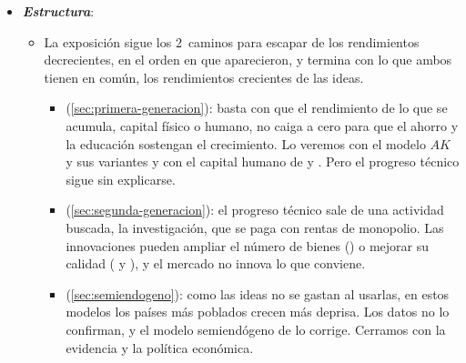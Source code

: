 \documentclass[11pt]{article}
\begin{document}
\begin{itemize}
\item \textbf{\emph{Estructura}}:
  \begin{itemize}
  \item La exposición sigue los 2~caminos para escapar de los rendimientos decrecientes, en el orden en que aparecieron, y termina con lo que ambos tienen en común, los rendimientos crecientes de las ideas.
  \begin{itemize}
  \item {} (\ref{sec:primera-generacion}): basta con que el rendimiento de lo que se acumula, capital físico o humano, no caiga a cero para que el ahorro y la educación sostengan el crecimiento. Lo veremos con el modelo $AK$ y sus variantes y con el capital humano de  y . Pero el progreso técnico sigue sin explicarse.
  \item {} (\ref{sec:segunda-generacion}): el progreso técnico sale de una actividad buscada, la investigación, que se paga con rentas de monopolio. Las innovaciones pueden ampliar el número de bienes () o mejorar su calidad ( y ), y el mercado no innova lo que conviene.
  \item {} (\ref{sec:semiendogeno}): como las ideas no se gastan al usarlas, en estos modelos los países más poblados crecen más deprisa. Los datos no lo confirman, y el modelo semiendógeno de  lo corrige. Cerramos con la evidencia y la política económica.
  \end{itemize}
  \end{itemize}
\end{itemize}
\end{document}
